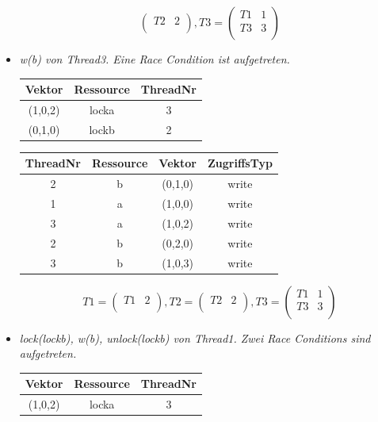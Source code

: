 \documentclass[10pt,a4paper]{article}
\begin{document}
\begin{flushleft}
\begin{itemize}
\[\begin{pmatrix}
		T2 & 2\\
	\end{pmatrix}
	, T3 = \begin{pmatrix}
		T1 & 1\\		
		T3 & 3\\
	\end{pmatrix}
\]
\item \textit{w(b) von Thread3. Eine Race Condition ist aufgetreten.}\\[0.3cm]
\begin{tabular}{ >{\small}c >{\small}c >{\small}c }
  	Vektor & Ressource & ThreadNr \\\hline
  	(1,0,2) & locka & 3 \\
  	(0,1,0) & lockb & 2 \\\hline
\end{tabular}\hspace*{0.5cm}
\begin{tabular}{ >{\small}c >{\small}c >{\small}c >{\small}c }
  	ThreadNr & Ressource & Vektor & ZugriffsTyp \\\hline
  	2 & b & (0,1,0) & write \\
  	1 & a & (1,0,0) & write \\
  	3 & a & (1,0,2) & write \\
  	\color{red}2 & \color{red}b & \color{red}(0,2,0) & \color{red}write\\
  	\color{red}3 & \color{red}b & \color{red}(1,0,3) & \color{red}write \\\hline
\end{tabular}
\[
	T1 = \begin{pmatrix}
		T1 & 2\\
	\end{pmatrix}
	, T2 = \begin{pmatrix}
		T2 & 2\\
	\end{pmatrix}
	, T3 = \begin{pmatrix}
		T1 & 1\\		
		T3 & 3\\
	\end{pmatrix}
\]
\item \textit{lock(lockb), w(b), unlock(lockb) von Thread1. Zwei Race Conditions sind aufgetreten.}\\[0.3cm]
\begin{tabular}{ >{\small}c >{\small}c >{\small}c }
  	Vektor & Ressource & ThreadNr \\\hline
  	(1,0,2) & locka & 3 \\

\end{tabular}
\end{itemize}
\end{flushleft}
\end{document}
